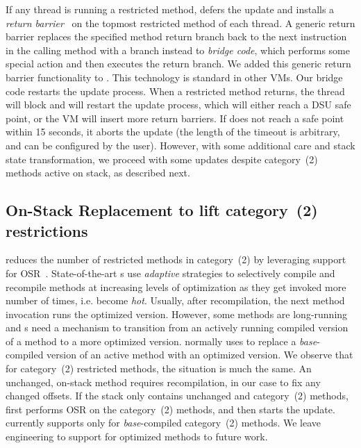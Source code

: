 If any thread is running a restricted method, \JV defers the update and
installs a \emph{return barrier}~\cite{return-barrier} on the topmost restricted method of each
thread.  A generic return barrier replaces the specified method return branch
back to the next instruction in the calling method with a branch instead to
\emph{bridge code}, which performs some special action and then executes
the return branch.  We added this generic return barrier functionality to
\RVM. This technology is standard in other VMs.  Our bridge code
restarts the update process.  When a restricted method returns,
the thread will block and \JV will restart the update process, which will
either reach a DSU safe point, or the VM will insert more return barriers.
If \JV does not reach a safe point within 15 seconds, it aborts the update
(the length of the timeout is arbitrary, and can be configured by the user).
However, with some additional care and stack state transformation, we
proceed 
with some updates despite
category~(2) methods active on stack, as described next.



\subsection{On-Stack Replacement to lift category~(2) restrictions}
\label{sec:osr}
\JV reduces the number of
restricted methods in category~(2) by leveraging \VM support for
\acf{OSR}~\cite{osr-self-1,osr-self-2}. State-of-the-art \VM{}s use
\emph{adaptive}
strategies to selectively compile and recompile methods at increasing
levels of optimization as they get invoked more number of times, i.e.
become \emph{hot}. Usually, after recompilation, the next method invocation
runs the optimized version. However, some methods are long-running and
\VM{}s need a mechanism to transition from an actively running compiled
version of a method to a more optimized version.  \RVM normally uses \OSR
to replace a \emph{base}-compiled version of an active method with an
optimized version.  We observe that for category~(2) restricted methods,
the situation is much the same. An unchanged, on-stack method requires
recompilation, in our case to fix any changed offsets. If the stack only
contains unchanged and category~(2) methods, \JV first performs OSR on the
category~(2) methods, and then starts the
update. \JV currently supports \OSR only for \emph{base}-compiled
category~(2) methods. We leave engineering \JV to support \OSR for
optimized methods to future work.


